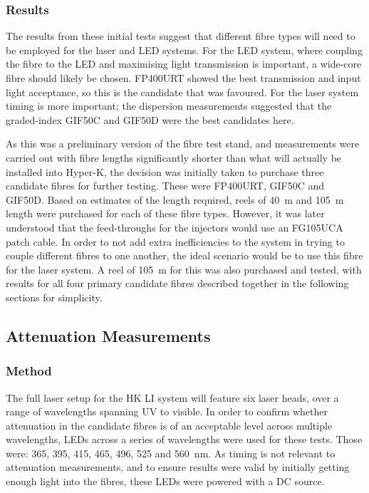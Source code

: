 \documentclass[a4paper,11pt]{article}
\begin{document}
\subsubsection{Results}

The results from these initial tests suggest that different fibre types will need to be employed for the laser and LED systems. For the LED system, where coupling the fibre to the LED and maximising light transmission is important, a wide-core fibre should likely be chosen. FP400URT showed the best transmission and input light acceptance, so this is the candidate that was favoured. For the laser system timing is more important; the dispersion measurements suggested that the graded-index GIF50C and GIF50D were the best candidates here.

As this was a preliminary version of the fibre test stand, and measurements were carried out with fibre lengths significantly shorter than what will actually be installed into Hyper-K, the decision was initially taken to purchase three candidate fibres for further testing. These were FP400URT, GIF50C and GIF50D. Based on estimates of the length required, reels of 40~m and 105~m length were purchased for each of these fibre types. However, it was later understood that the feed-throughs for the injectors would use an FG105UCA patch cable. In order to not add extra inefficiencies to the system in trying to couple different fibres to one another, the ideal scenario would be to use this fibre for the laser system. A reel of 105~m for this was also purchased and tested, with results for all four primary candidate fibres described together in the following sections for simplicity.


\subsection{Attenuation Measurements}

\subsubsection{Method}\label{sec:fibre:sub:att:sub:method}

The full laser setup for the HK LI system will feature six laser heads, over a range of wavelengths spanning UV to visible. In order to confirm whether attenuation in the candidate fibres is of an acceptable level across multiple wavelengths, LEDs across a series of wavelengths were used for these tests. Those were: 365, 395, 415, 465, 496, 525 and 560~nm. As timing is not relevant to attenuation measurements, and to ensure results were valid by initially getting enough light into the fibres, these LEDs were powered with a DC source.
\end{document}
